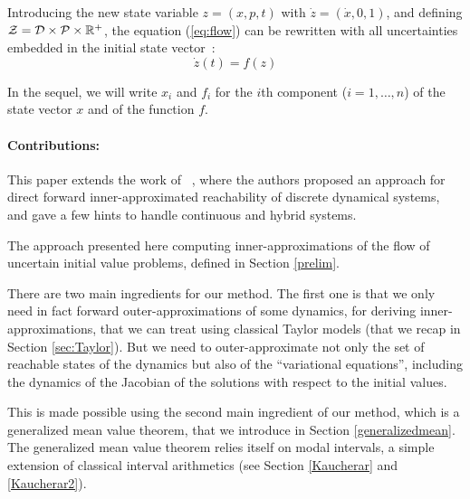 \documentclass{sig-alternate-05-2015} %
\newcommand\ForAuthors[1]%
 {\par\smallskip                     %
  \begin{center}%
   \fbox%
   {\parbox{0.9\linewidth}%
    {\raggedright\sc--- #1}%
   }%
  \end{center}%
  \par\smallskip                     %
 }
\def\R{{\mathbb R}}
\begin{document}
Introducing the new state variable $z=(x,p,t)$ with $\dot z = (\dot x,0,1)$, and defining ${\cal Z} = {\cal D} \times {\cal P} \times \R^+$,
the equation (\ref{eq:flow}) can be rewritten with all uncertainties embedded in the initial state vector~:
\begin{equation} \dot z(t) = f(z)
\label{eq:flowb}
\end{equation}

In the sequel, we will write $x_i$ and $f_i$ for the $i$th component ($i=1,\ldots,n$) of
the state vector $x$ and of the function $f$. 

\paragraph{Contributions:}

This paper extends the work of ~\cite{sas07,hscc14}, where the authors proposed an approach for direct forward inner-approximated reachability of 
discrete dynamical systems, and gave a few hints to handle continuous and hybrid systems. 

The approach presented here 
computing inner-approximations of the flow of uncertain initial value problems, defined
in Section \ref{prelim}. 

There are two main ingredients for our method. The first one is that we only need in fact forward 
outer-approxima\-tions of some dynamics, for deriving inner-approximations, that we can treat using classical
Taylor models (that we recap in Section \ref{sec:Taylor}). But we need to outer-approximate not only 
the set of reachable states of the dynamics but also
of the ``variational equations'', including the dynamics of the Jacobian of the solutions with respect to the
initial values. 

This is made possible using the second main ingredient of our method, which is 
a generalized mean value theorem, that we introduce in Section \ref{generalizedmean}. 
The generalized mean value theorem relies itself on modal intervals, a simple 
extension of classical interval arithmetics (see Section \ref{Kaucherar} and \ref{Kaucherar2}). 
\end{document}

